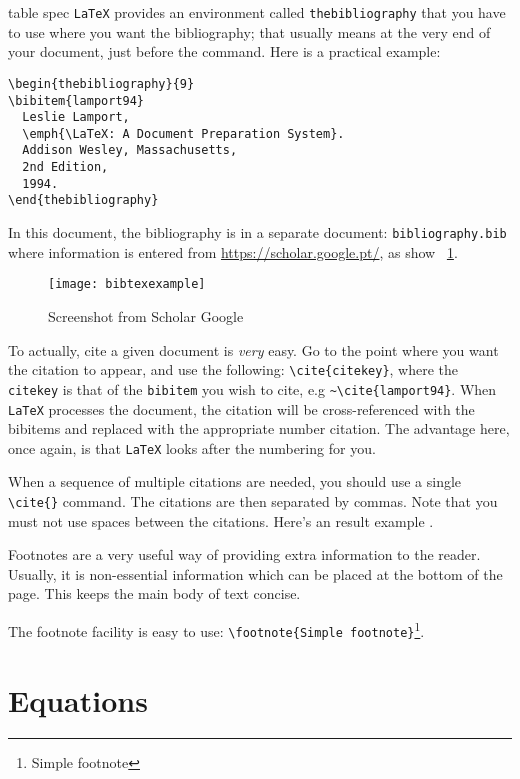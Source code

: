 \begin{tabular}[pos]{table spec}
\texttt{LaTeX} provides an environment called \texttt{thebibliography} that you have to use where you want the bibliography; that usually means at the very end of your document, just before the \verb!! command. Here is a practical example:

\begin{verbatim}
\begin{thebibliography}{9}
\bibitem{lamport94}
  Leslie Lamport,
  \emph{\LaTeX: A Document Preparation System}.
  Addison Wesley, Massachusetts,
  2nd Edition,
  1994.
\end{thebibliography}
\end{verbatim}

In this document, the bibliography is in a separate document: \texttt{bi\-blio\-gra\-phy.bib}  where information is entered from \url{https://scholar.google.pt/}, as show  \figurename~\ref{fig:bibtex}.

\begin{figure}[ht]
	\centering
	\texttt{[image: bibtexexample]}
	  \caption{Screenshot from Scholar Google}
  \label{fig:bibtex}
\end{figure}

To actually, cite a given document is \textit{very} easy. Go to the point where you want the citation to appear, and use the following: \verb!\cite{citekey}!, where the \texttt{citekey} is that of the \texttt{bibitem} you wish to cite, e.g \verb!~\cite{lamport94}!.  When \texttt{LaTeX} processes the document, the citation will be cross-referenced with the bibitems and replaced with the appropriate number citation. The advantage here, once again, is that \texttt{LaTeX} looks after the numbering for you.

When a sequence of multiple citations are needed, you should use a single \verb!\cite{}! command. The citations are then separated by commas. Note that you must not use spaces between the citations. Here's an result example \cite{strunk,chicago,texbook}.

Footnotes are a very useful way of providing extra information to the reader. Usually, it is non-essential information which can be placed at the bottom of the page. This keeps the main body of text concise.

The footnote facility is easy to use: \verb!\footnote{Simple footnote}!\footnote{Simple footnote}. 

\section{Equations}


\end{tabular}
